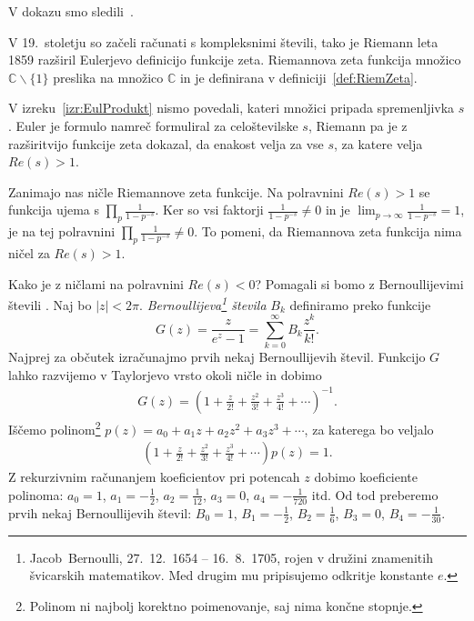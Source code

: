 \documentclass[mat1]{fmfdelo}
\begin{document}
V dokazu smo sledili~\cite{riemannHyp}.

V 19.~stoletju so začeli računati s kompleksnimi števili, tako je Riemann leta 1859 razširil Eulerjevo definicijo funkcije zeta. Riemannova zeta funkcija množico  $\mathbb{C}\backslash\{1\}$ preslika na množico  $\mathbb{C}$ in je definirana v definiciji~\ref{def:RiemZeta}.

\begin{opomba}
V izreku~\ref{izr:EulProdukt} nismo povedali, kateri množici pripada spremenljivka $s$. Euler je formulo namreč formuliral za celoštevilske $s$, Riemann pa je z razširitvijo funkcije zeta dokazal, da enakost velja za vse $s$, za katere velja $Re(s)>1$.
\end{opomba}

Zanimajo nas ničle Riemannove zeta funkcije. Na polravnini $Re(s)>1$ se funkcija ujema s $\prod_{p}\frac{1}{1-p^{-s}}$. Ker so vsi faktorji $\frac{1}{1-p^{-s}} \neq 0$ in je $\lim_{p\to\infty} \frac{1}{1-p^{-s}} = 1$, je na tej polravnini $\prod_{p}\frac{1}{1-p^{-s}} \neq 0$. To pomeni, da Riemannova zeta funkcija nima ničel za $Re(s)>1$.

Kako je z ničlami na polravnini $Re(s)<0$?
Pomagali si bomo z Bernoullijevimi števili \cite[poglavje 3]{bernoulli}. Naj bo $|z|<2\pi$. \emph{Bernoullijeva\footnote{Jacob~Bernoulli, 27.\ 12.\ 1654 -- 16.\ 8.\ 1705, rojen v družini znamenitih švicarskih matematikov. Med drugim mu pripisujemo odkritje konstante $e$.} števila} $B_{k}$ definiramo preko funkcije
\begin{equation}
\label{Eq:Bernoulli}
G(z) = \frac{z}{e^z-1} = \sum_{k=0}^{\infty} B_{k} \frac{z^k}{k!}.
\end{equation}
%
Najprej za občutek izračunajmo prvih nekaj Bernoullijevih števil. Funkcijo $G$ lahko razvijemo v Taylorjevo vrsto okoli ničle in dobimo
\begin{align*}
G(z) = \left(1 + \frac{z}{2!} + \frac{z^2}{3!} + \frac{z^3}{4!} + \cdots \right)^{-1}.
\end{align*}
%
Iščemo polinom\footnote{Polinom ni najbolj korektno poimenovanje, saj nima končne stopnje.} $p(z) = a_{0}+a_{1}z+a_{2}z^2+a_{3}z^3+\cdots$, za katerega bo veljalo
\begin{align*}
\left(1 + \frac{z}{2!} + \frac{z^2}{3!} + \frac{z^3}{4!} + \cdots \right) p(z) = 1.
\end{align*}
%
Z rekurzivnim računanjem koeficientov pri potencah $z$ dobimo koeficiente polinoma: $a_{0}=1$, $a_{1}=-\frac{1}{2}$, $a_{2}=\frac{1}{12}$, $a_{3}=0$, $a_{4}=-\frac{1}{720}$ itd. Od tod preberemo prvih nekaj Bernoullijevih števil: $B_{0} = 1$, $B_{1} = -\frac{1}{2}$,  $B_{2} = \frac{1}{6}$,  $B_{3} = 0$, $B_{4} = -\frac{1}{30}$.
\end{document}
